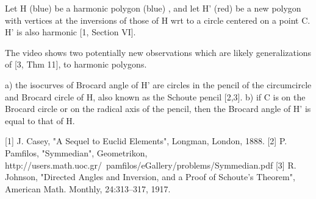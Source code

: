 Let H (blue) be a harmonic polygon (blue) , and let H' (red) be a new polygon with vertices at the inversions of those of H wrt to a circle centered on a point C. H' is also harmonic [1, Section VI].

The video shows two potentially new observations which are likely generalizations of [3, Thm 11], to harmonic polygons.

a) the isocurves of Brocard angle of H' are circles in the pencil of the circumcircle and Brocard circle of H, also known as the Schoute pencil [2,3]. 
b) if C is on the Brocard circle or on the radical axis of the pencil, then the Brocard angle of H' is equal to that of H.

[1] J. Casey, "A Sequel to Euclid Elements", Longman, London, 1888.
[2] P. Pamfilos, "Symmedian", Geometrikon, http://users.math.uoc.gr/~pamfilos/eGallery/problems/Symmedian.pdf
[3] R. Johnson, "Directed Angles and Inversion, and a Proof of Schoute's Theorem", American Math. Monthly, 24:313–317, 1917.